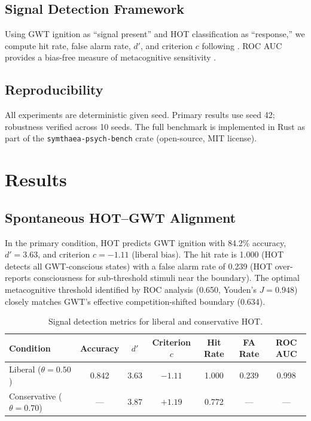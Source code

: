 \documentclass[10pt,letterpaper]{article}
\newcommand{\dprime}{d'}
\begin{document}
\subsection{Signal Detection Framework}

Using GWT ignition as ``signal present'' and HOT classification as
``response,'' we compute hit rate, false alarm rate, $\dprime$, and
criterion $c$ following \citet{macmillan2005detection}.  ROC AUC
provides a bias-free measure of metacognitive sensitivity
\citep{green1966signal}.

\subsection{Reproducibility}

All experiments are deterministic given seed.  Primary results use
seed 42; robustness verified across 10 seeds.  The full benchmark
is implemented in Rust as part of the \texttt{symthaea-psych-bench}
crate (open-source, MIT license).


\section{Results}

\subsection{Spontaneous HOT--GWT Alignment}

In the primary condition, HOT predicts GWT ignition with 84.2\%
accuracy, $\dprime = 3.63$, and criterion $c = -1.11$ (liberal bias).
The hit rate is 1.000 (HOT detects all GWT-conscious states) with a
false alarm rate of 0.239 (HOT over-reports consciousness for
sub-threshold stimuli near the boundary).  The optimal metacognitive
threshold identified by ROC analysis (0.650, Youden's $J = 0.948$)
closely matches GWT's effective competition-shifted boundary (0.634).

\begin{table}[t]
\centering
\caption{Signal detection metrics for liberal and conservative HOT.}
\label{tab:sdt}
\small
\begin{tabular}{@{}lcccccc@{}}
\toprule
Condition & Accuracy & $\dprime$ & Criterion $c$ & Hit Rate & FA Rate & ROC AUC \\
\midrule
Liberal ($\theta = 0.50$)       & 0.842 & 3.63 & $-1.11$ & 1.000 & 0.239 & 0.998 \\
Conservative ($\theta = 0.70$)  & ---   & 3.87 & $+1.19$ & 0.772 & ---   & ---   \\
\bottomrule
\end{tabular}
\end{table}
\end{document}
